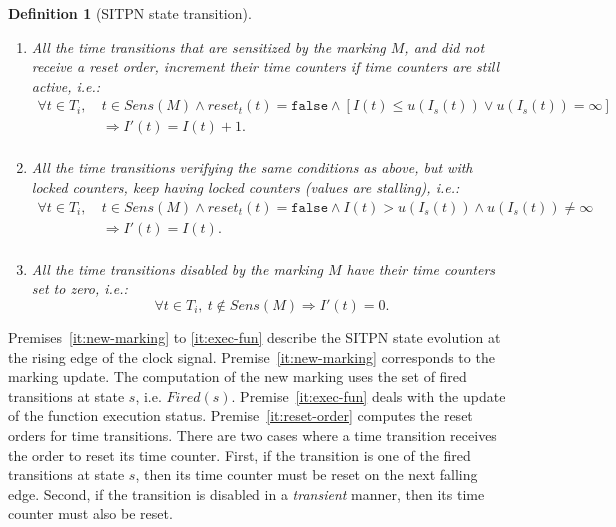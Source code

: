 \documentclass[pdflatex,sn-mathphys]{sn-jnl}%
\theoremstyle{thmstyleone}%
\theoremstyle{thmstyletwo}%
\theoremstyle{thmstylethree}%
\newtheorem{definition}{Definition}%
\begin{document}
\begin{definition}[SITPN state transition]
\begin{itemize}
\begin{enumerate}[resume]
    \item\label{it:inc-counters} All the time transitions that are
      sensitized by the marking $M$, and
      did not receive a reset order, increment their time counters if time counters are still active, i.e.:
      \begin{equation*}
        \begin{split}
          \forall{}t\in{}T_i,~&t\in{}Sens(M)\land{}reset_t(t)=\mathtt{false}\land{}[I(t)\le{}u(I_s(t))\lor{}u(I_s(t))=\infty]\\
                              & \Rightarrow{}I'(t)=I(t)+1. \\
        \end{split}
      \end{equation*}
    \item\label{it:locked-counters} All the time transitions
      verifying the same
      conditions as above, but with locked counters, keep having locked counters (values are stalling), i.e.:        
      \begin{equation*}
        \begin{split}
          \forall{}t\in{}T_i,~&t\in{}Sens(M)\land{}reset_t(t)=\mathtt{false}\land{}I(t)>{}u(I_s(t))\land{}u(I_s(t))\neq\infty\\
                              & \Rightarrow{}I'(t)=I(t).\\
        \end{split}
      \end{equation*}
      
    \item\label{it:reset-not-sens} All the time transitions disabled by the marking $M$ have their time counters set to zero, i.e.:
      \begin{equation*}
        \forall{}t\in{}T_i,~t\notin{}Sens(M)\Rightarrow{}I'(t)=0.
      \end{equation*}
    \end{enumerate}
    
  \end{itemize}
\end{definition}

Premises~\ref{it:new-marking} to \ref{it:exec-fun} describe the SITPN
state evolution at the rising edge of the clock signal.
Premise~\ref{it:new-marking} corresponds to the marking update. The
computation of the new marking uses the set of fired transitions at
state $s$, i.e. $Fired(s)$. Premise~\ref{it:exec-fun} deals with the
update of the function execution status. Premise~\ref{it:reset-order}
computes the reset orders for time transitions. There are two cases
where a time transition receives the order to reset its time
counter. First, if the transition is one of the fired transitions at
state $s$, then its time counter must be reset on the next falling
edge. Second, if the transition is disabled in a \emph{transient}
manner, then its time counter must also be reset.
\end{document}
